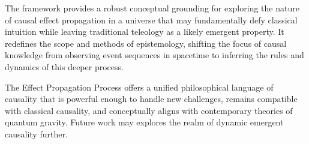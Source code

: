 \documentclass{article}
\begin{document}
The framework provides a robust conceptual grounding for exploring the nature of causal effect propagation in a universe that may fundamentally defy classical intuition while leaving traditional teleology as a likely emergent property. It redefines the scope and methods of epistemology, shifting the focus of causal knowledge from observing event sequences in spacetime to inferring the rules and dynamics of this deeper process.

The Effect Propagation Process offers a unified philosophical language of causality that is powerful enough to handle new challenges, remains compatible with classical causality, and conceptually aligns with contemporary theories of quantum gravity. Future work may explores the realm of dynamic emergent causality further. 


\newpage

  
  
\end{document}
